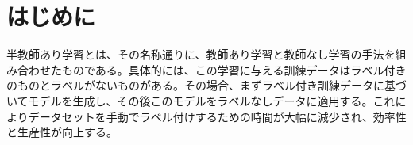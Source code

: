\section{はじめに}
半教師あり学習とは、その名称通りに、教師あり学習と教師なし学習の手法を組み合わせたものである。具体的には、この学習に与える訓練データはラベル付きのものとラベルがないものがある。その場合、まずラベル付き訓練データに基づいてモデルを生成し、その後このモデルをラベルなしデータに適用する。これによりデータセットを手動でラベル付けするための時間が大幅に減少され、効率性と生産性が向上する。
